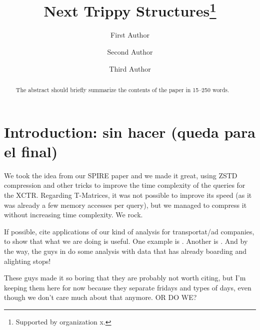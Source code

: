 \documentclass[runningheads]{llncs}
\newcommand{\acumm}{T-Matrices} %
\newcommand{\ctr}{XCTR}
\begin{document}
%
\title{Next Trippy Structures\thanks{Supported by organization x.}}
%
%
\author{First Author \and
Second Author \and
Third Author}
%
%
%
\maketitle              %
%
\begin{abstract}
The abstract should briefly summarize the contents of the paper in
15--250 words.

\end{abstract}
%
%
%
\section{Introduction: sin hacer (queda para el final)}
We took the idea from our SPIRE paper and we made it great, using ZSTD compression and other tricks to improve the time complexity of the queries for the \ctr. Regarding \acumm, it was not possible to improve its speed (as it was already a few memory accesses per query), but we managed to compress it without increasing time complexity. We rock.

If possible, cite applications of our kind of analysis for transportat/ad companies, to show that what we are doing is useful. One example is \cite{tu2018spatial}. Another is \cite{zhang2017targeted}. And by the way, the guys in \cite{weng2018mining} do some analysis with data that has already boarding and alighting stops!

These guys \cite{wang2014aggregated} made it so boring that they are probably not worth citing, but I'm keeping them here for now because they separate fridays and types of days, even though we don't care much about that anymore. OR DO WE?
\end{document}
